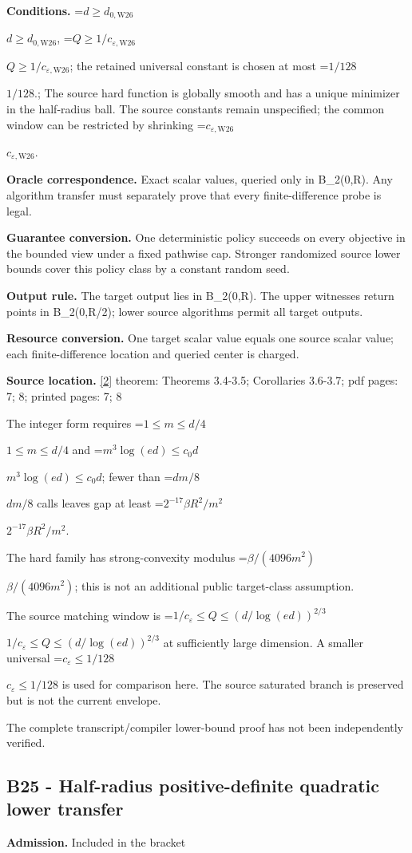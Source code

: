 \documentclass[10pt,a4paper]{article}
\newcommand{\AtlasMath}[1]{\par\begingroup\centering\setbox0=\hbox{$\displaystyle #1$}\ifdim\wd0>1.4\linewidth\typeout{ATLAS WIDE FORMULA: \the\wd0}\fi\ifdim\wd0>\linewidth\resizebox{\linewidth}{!}{\box0}\else\box0\fi\par\endgroup}
\newcommand{\AtlasInlineMath}[1]{\begingroup\setbox0=\hbox{$#1$}\ifdim\wd0>.4\linewidth\endgroup\AtlasMath{#1}\else\endgroup$#1$\fi}
\begin{document}
\textbf{Conditions.} \AtlasInlineMath{d\ge d_{0,\mathrm{W26}}}, \AtlasInlineMath{Q\ge1/c_{\varepsilon,\mathrm{W26}}}; the retained universal constant is chosen at most \AtlasInlineMath{1/128}.; The source hard function is globally smooth and has a unique minimizer in the half-radius ball. The source constants remain unspecified; the common window can be restricted by shrinking \AtlasInlineMath{c_{\varepsilon,\mathrm{W26}}}.

\textbf{Oracle correspondence.} Exact scalar values, queried only in B\_2(0,R). Any algorithm transfer must separately prove that every finite-difference probe is legal.

\textbf{Guarantee conversion.} One deterministic policy succeeds on every objective in the bounded view under a fixed pathwise cap. Stronger randomized source lower bounds cover this policy class by a constant random seed.

\textbf{Output rule.} The target output lies in B\_2(0,R). The upper witnesses return points in B\_2(0,R/2); lower source algorithms permit all target outputs.

\textbf{Resource conversion.} One target scalar value equals one source scalar value; each finite-difference location and queried center is charged.

\textbf{Source location.} \href{https://arxiv.org/abs/2609.18230v2}{[2]} theorem: Theorems 3.4-3.5; Corollaries 3.6-3.7; pdf pages: 7; 8; printed pages: 7; 8

The integer form requires \AtlasInlineMath{1\le m\le d/4} and \AtlasInlineMath{m^3\log(ed)\le c_0d}; fewer than \AtlasInlineMath{dm/8} calls leaves gap at least \AtlasInlineMath{2^{-17}\beta R^2/m^2}.

The hard family has strong-convexity modulus \AtlasInlineMath{\beta/(4096m^2)}; this is not an additional public target-class assumption.

The source matching window is \AtlasInlineMath{1/c_\varepsilon\le Q\le(d/\log(ed))^{2/3}} at sufficiently large dimension. A smaller universal \AtlasInlineMath{c_\varepsilon\le1/128} is used for comparison here. The source saturated branch is preserved but is not the current envelope.

The complete transcript/compiler lower-bound proof has not been independently verified.

\subsection{B25 - Half-radius positive-definite quadratic lower transfer}
\textbf{Admission.} Included in the bracket
\end{document}

